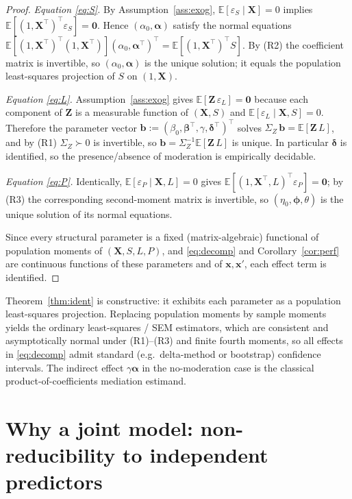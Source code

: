 \documentclass{amsart}
\theoremstyle{definition}
\theoremstyle{plain}
\begin{document}
\begin{proof}
\emph{Equation \eqref{eq:S}.} By Assumption~\ref{ass:exog}, $\mathbb E[\varepsilon_S\mid\bm
X]=0$ implies $\mathbb E[(1,\bm X^\top)^\top\varepsilon_S]=\bm0$. Hence
$(\alpha_0,\bm\alpha)$ satisfy the normal equations
$\mathbb E[(1,\bm X^\top)^\top(1,\bm X^\top)](\alpha_0,\bm\alpha^\top)^\top
=\mathbb E[(1,\bm X^\top)^\top S]$. By (R2) the coefficient matrix is invertible, so
$(\alpha_0,\bm\alpha)$ is the unique solution; it equals the population least-squares
projection of $S$ on $(1,\bm X)$.

\emph{Equation \eqref{eq:L}.} Assumption~\ref{ass:exog} gives
$\mathbb E[\bm Z\,\varepsilon_L]=\bm0$ because each component of $\bm Z$ is a measurable
function of $(\bm X,S)$ and $\mathbb E[\varepsilon_L\mid \bm X,S]=0$. Therefore the
parameter vector $\bm b:=(\beta_0,\bm\beta^\top,\gamma,\bm\delta^\top)^\top$ solves
$\Sigma_Z\,\bm b=\mathbb E[\bm Z\,L]$, and by (R1) $\Sigma_Z\succ0$ is invertible, so
$\bm b=\Sigma_Z^{-1}\mathbb E[\bm Z\,L]$ is unique. In particular $\bm\delta$ is identified,
so the presence/absence of moderation is empirically decidable.

\emph{Equation \eqref{eq:P}.} Identically, $\mathbb E[\varepsilon_P\mid\bm X,L]=0$ gives
$\mathbb E[(1,\bm X^\top,L)^\top\varepsilon_P]=\bm0$; by (R3) the corresponding
second-moment matrix is invertible, so $(\eta_0,\bm\phi,\theta)$ is the unique solution of
its normal equations.

Since every structural parameter is a fixed (matrix-algebraic) functional of population
moments of $(\bm X,S,L,P)$, and \eqref{eq:decomp} and Corollary~\ref{cor:perf} are
continuous functions of these parameters and of $\bm x,\bm x'$, each effect term is
identified.
\end{proof}

\begin{remark}
Theorem~\ref{thm:ident} is constructive: it exhibits each parameter as a population
least-squares projection. Replacing population moments by sample moments yields the ordinary
least-squares / SEM estimators, which are consistent and asymptotically normal under (R1)--(R3)
and finite fourth moments, so all effects in \eqref{eq:decomp} admit standard (e.g.\
delta-method or bootstrap) confidence intervals. The indirect effect $\gamma\bm\alpha$ in the
no-moderation case is the classical product-of-coefficients mediation estimand.
\end{remark}

\section{Why a joint model: non-reducibility to independent predictors}
\end{document}
